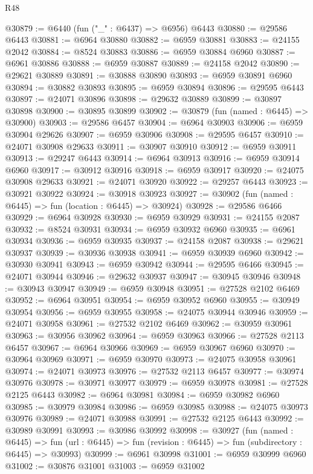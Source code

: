 \begin{lexlean}{R48}
\begin{coremodule}
@30879 := @6440 (fun ("_" : @6437) => @6956) @6443
@30880 := @29586 @6443
@30881 := @6964 @30880
@30882 := @6959 @30881
@30883 := @24155 @2042
@30884 := @8524 @30883
@30886 := @6959 @30884 @6960
@30887 := @6961 @30886
@30888 := @6959 @30887
@30889 := @24158 @2042
@30890 := @29621 @30889
@30891 := @30888 @30890
@30893 := @6959 @30891 @6960
@30894 := @30882 @30893
@30895 := @6959 @30894
@30896 := @29595 @6443
@30897 := @24071 @30896
@30898 := @29632 @30889
@30899 := @30897 @30898
@30900 := @30895 @30899
@30902 := @30879 (fun (named : @6445) => @30900)
@30903 := @29586 @6457
@30904 := @6964 @30903
@30906 := @6959 @30904 @29626
@30907 := @6959 @30906
@30908 := @29595 @6457
@30910 := @24071 @30908 @29633
@30911 := @30907 @30910
@30912 := @6959 @30911
@30913 := @29247 @6443
@30914 := @6964 @30913
@30916 := @6959 @30914 @6960
@30917 := @30912 @30916
@30918 := @6959 @30917
@30920 := @24075 @30908 @29633
@30921 := @24071 @30920
@30922 := @29257 @6443
@30923 := @30921 @30922
@30924 := @30918 @30923
@30927 := @30902 (fun (named : @6445) => fun (location : @6445) => @30924)
@30928 := @29586 @6466
@30929 := @6964 @30928
@30930 := @6959 @30929
@30931 := @24155 @2087
@30932 := @8524 @30931
@30934 := @6959 @30932 @6960
@30935 := @6961 @30934
@30936 := @6959 @30935
@30937 := @24158 @2087
@30938 := @29621 @30937
@30939 := @30936 @30938
@30941 := @6959 @30939 @6960
@30942 := @30930 @30941
@30943 := @6959 @30942
@30944 := @29595 @6466
@30945 := @24071 @30944
@30946 := @29632 @30937
@30947 := @30945 @30946
@30948 := @30943 @30947
@30949 := @6959 @30948
@30951 := @27528 @2102 @6469
@30952 := @6964 @30951
@30954 := @6959 @30952 @6960
@30955 := @30949 @30954
@30956 := @6959 @30955
@30958 := @24075 @30944 @30946
@30959 := @24071 @30958
@30961 := @27532 @2102 @6469
@30962 := @30959 @30961
@30963 := @30956 @30962
@30964 := @6959 @30963
@30966 := @27528 @2113 @6457
@30967 := @6964 @30966
@30969 := @6959 @30967 @6960
@30970 := @30964 @30969
@30971 := @6959 @30970
@30973 := @24075 @30958 @30961
@30974 := @24071 @30973
@30976 := @27532 @2113 @6457
@30977 := @30974 @30976
@30978 := @30971 @30977
@30979 := @6959 @30978
@30981 := @27528 @2125 @6443
@30982 := @6964 @30981
@30984 := @6959 @30982 @6960
@30985 := @30979 @30984
@30986 := @6959 @30985
@30988 := @24075 @30973 @30976
@30989 := @24071 @30988
@30991 := @27532 @2125 @6443
@30992 := @30989 @30991
@30993 := @30986 @30992
@30998 := @30927
    (fun (named : @6445) =>
    fun (url : @6445) => fun (revision : @6445) => fun (subdirectory : @6445) => @30993)
@30999 := @6961 @30998
@31001 := @6959 @30999 @6960
@31002 := @30876 @31001
@31003 := @6959 @31002

\end{coremodule}
\end{lexlean}
